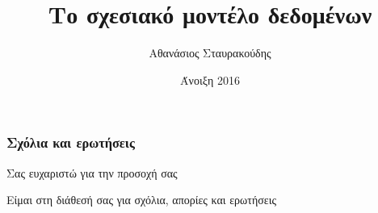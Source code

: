 \documentclass[xcolor=dvipsnames, aspectratio=149, 12pt]{beamer}
\begin{document}
\el
\author[]{Αθανάσιος Σταυρακούδης}
\title[]{Το σχεσιακό μοντέλο δεδομένων}
\date[]{Άνοιξη 2016}

{
\begin{frame}%
  \titlepage
\end{frame}
}
\addtocounter{framenumber}{-1}







\begin{frame}
\frametitle{Σχόλια και ερωτήσεις}
\par {\Large \color{red} Σας ευχαριστώ για την προσοχή σας }
\vspace{1cm}
\par Είμαι στη διάθεσή σας για σχόλια, απορίες και ερωτήσεις

\end{frame}
\end{document}
